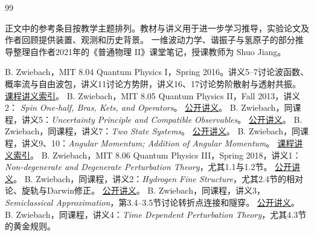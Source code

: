 \renewcommand{\bibname}{参考资料与实验出处}
\begin{thebibliography}{99}
    \item[] 正文中的参考条目按教学主题排列。教材与讲义用于进一步学习推导，实验论文及作者回顾提供装置、观测和历史背景。
    一维波动力学、谐振子与氢原子的部分推导整理自作者2021年的《普通物理 II》课堂笔记，授课教师为 Shuo Jiang。

    B. Zwiebach，MIT 8.04 Quantum Physics I，Spring 2016。讲义5--7讨论波函数、概率流与自由波包，讲义11讨论方势阱，讲义16、17讨论势阶散射与透射共振。
    \href{https://ocw.mit.edu/courses/8-04-quantum-physics-i-spring-2016/pages/lecture-notes/}{课程讲义索引}。
    B. Zwiebach，MIT 8.05 Quantum Physics II，Fall 2013，讲义2：
    \textit{Spin One-half, Bras, Kets, and Operators}。
    \href{https://ocw.mit.edu/courses/8-05-quantum-physics-ii-fall-2013/resources/lecture-notes-2/}{公开讲义}。
    B. Zwiebach，同课程，讲义5：\textit{Uncertainty Principle and Compatible Observables}。
    \href{https://ocw.mit.edu/courses/8-05-quantum-physics-ii-fall-2013/resources/lecture-notes-5/}{公开讲义}。
    B. Zwiebach，同课程，讲义7：\textit{Two State Systems}。
    \href{https://ocw.mit.edu/courses/8-05-quantum-physics-ii-fall-2013/resources/lecture-notes-7/}{公开讲义}。
    B. Zwiebach，同课程，讲义9、10：\textit{Angular Momentum; Addition of Angular Momentum}。
    \href{https://ocw.mit.edu/courses/8-05-quantum-physics-ii-fall-2013/pages/lecture-notes/}{课程讲义索引}。
    B. Zwiebach，MIT 8.06 Quantum Physics III，Spring 2018，讲义1：
    \textit{Non-degenerate and Degenerate Perturbation Theory}，尤其1.1与1.2节。
    \href{https://ocw.mit.edu/courses/8-06-quantum-physics-iii-spring-2018/resources/chapter-1-non-degenerate-and-degenerate-perturbation-theory/}{公开讲义}。
    B. Zwiebach，同课程，讲义2：\textit{Hydrogen Fine Structure}，尤其2.4节的相对论、旋轨与Darwin修正。
    \href{https://ocw.mit.edu/courses/8-06-quantum-physics-iii-spring-2018/resources/chapter-2-hydrogen-fine-structure/}{公开讲义}。
    B. Zwiebach，同课程，讲义3，\textit{Semiclassical Approximation}，第3.4--3.5节讨论转折点连接和隧穿。
    \href{https://ocw.mit.edu/courses/8-06-quantum-physics-iii-spring-2018/bf207c35150e1f5d93ef05d4664f406d_MIT8_06S18ch3.pdf}{公开讲义}。
    B. Zwiebach，同课程，讲义4：\textit{Time Dependent Perturbation Theory}，尤其4.3节的黄金规则。

\end{thebibliography}
